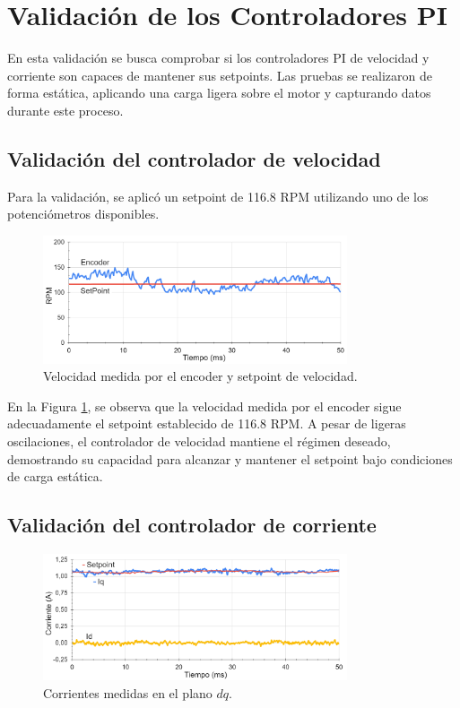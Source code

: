\documentclass[11pt]{report}
\begin{document}
\newpage
\section{Validación de los Controladores PI}
En esta validación se busca comprobar si los controladores PI de velocidad y corriente son capaces de mantener sus setpoints. Las pruebas se realizaron de forma estática, aplicando una carga ligera sobre el motor y capturando datos durante este proceso.

\subsection{Validación del controlador de velocidad}
Para la validación, se aplicó un setpoint de 116.8 RPM utilizando uno de los potenciómetros disponibles.

\begin{figure}[ht]
	\centering
	\includegraphics[width=0.8\textwidth]{imagenes/CV.png}
	\caption{Velocidad medida por el encoder y setpoint de velocidad.}
	\label{velocidad_encoder}
\end{figure}
\FloatBarrier

En la Figura \ref{velocidad_encoder}, se observa que la velocidad medida por el encoder sigue adecuadamente el setpoint establecido de 116.8 RPM. A pesar de ligeras oscilaciones, el controlador de velocidad mantiene el régimen deseado, demostrando su capacidad para alcanzar y mantener el setpoint bajo condiciones de carga estática.

\newpage
\subsection{Validación del controlador de corriente}

\begin{figure}[ht]
	\centering
	\includegraphics[width=0.8\textwidth]{imagenes/CV_CC.png}
	\caption{Corrientes medidas en el plano $dq$.}
	\label{cont_corrientes_dq}
\end{figure}
\FloatBarrier
\end{document}
